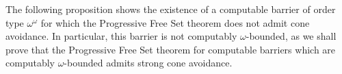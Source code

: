\documentclass{article}
\newcommand{\NN}[0]{\mathbb{N}}
\newcommand{\card}{\operatorname{card}}
\newcommand{\lex}{\mathrm{lex}}
\numberwithin{theorem}{section}
\newtheorem{proposition}[theorem]{Proposition}
\begin{document}



The following proposition shows the existence of a computable barrier of order type $\omega^\omega$ for which the Progressive Free Set theorem does not admit cone avoidance. In particular, this barrier is not computably $\omega$-bounded, as we shall prove that the Progressive Free Set theorem for computable barriers which are computably $\omega$-bounded admits strong cone avoidance.

\end{document}
